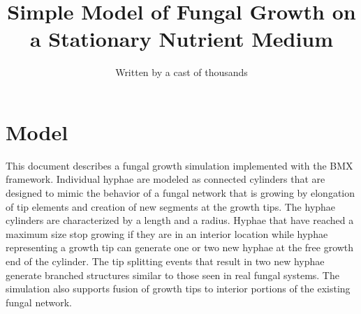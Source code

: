\documentclass[12pt]{article}
\begin{document}
\newcommand{\dt}{\Delta t}
\newcommand{\Fvec}{\overline{F}}
\newcommand{\fvec}{\overline{f}}
\newcommand{\rvec}{\overline{r}}
\newcommand{\omvec}{\overline{\omega}}
\newcommand{\xvec}{\overline{x}}
\newcommand{\Xvec}{\overline{X}}
\newcommand{\yvec}{\overline{y}}
\newcommand{\Yvec}{\overline{Y}}
\newcommand{\Vvec}{\overline{V}}
\newcommand{\Rvec}{\overline{R}}
\newcommand{\Gvec}{\overline{G}}
\newcommand{\svec}{\overline{s}}
\newcommand{\Tvec}{\overline{T}}
\newcommand{\Lvec}{\overline{L}}
\newcommand{\vvec}{\overline{v}}
\newcommand{\nhat}{\hat{n}}
\newcommand{\rhvec}{\overline{\rho}}
\newcommand{\Dmat}{\overline{\overline{D}}}
\newcommand{\Rmat}{\overline{\overline{R}}}
\newcommand{\Omat}{\overline{\overline{1}}}
\newcommand{\Imat}{\overline{\overline{I}}}
\newcommand{\Hmat}{\overline{\overline{H}}}
\newcommand{\Lag}{\mathcal{L}}
\title{Simple Model of Fungal Growth on a Stationary Nutrient Medium}
\author{Written by a cast of thousands}
\maketitle

\renewcommand{\thetable}{\Roman{table}}

\section{Model}
This document describes a fungal growth simulation implemented with the
BMX framework. Individual hyphae are modeled as connected cylinders that 
are designed to mimic the behavior of a fungal network that is growing by
elongation of tip elements and creation of new segments at the growth tips.
The hyphae cylinders are characterized by a length and a radius. Hyphae
that have reached a maximum size stop growing if they are in an interior
location while hyphae representing a growth tip can generate one or two new
hyphae at the free growth end of the cylinder. The tip splitting events that
result in two new hyphae generate branched structures similar to those
seen in real fungal systems. The simulation also supports fusion of growth
tips to interior portions of the existing fungal network.
\end{document}

